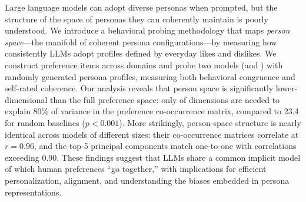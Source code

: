 Large language models can adopt diverse personas when prompted, but the structure of the space of personas they can coherently maintain is poorly understood.
We introduce a behavioral probing methodology that maps \emph{person space}---the manifold of coherent persona configurations---by measuring how consistently LLMs adopt profiles defined by everyday likes and dislikes.
We construct \nprefs{} preference items across \ndomains{} domains and probe two models (\nano and \mini) with \nprofiles{} randomly generated persona profiles, measuring both behavioral congruence and self-rated coherence.
Our analysis reveals that person space is significantly lower-dimensional than the full preference space: only \effrank{} of \nprefs{} dimensions are needed to explain 80\% of variance in the preference co-occurrence matrix, compared to 23.4 for random baselines ($p < 0.001$).
More strikingly, person-space structure is nearly identical across models of different sizes: their co-occurrence matrices correlate at $r = 0.96$, and the top-5 principal components match one-to-one with correlations exceeding $0.90$.
These findings suggest that LLMs share a common implicit model of which human preferences ``go together,'' with implications for efficient personalization, alignment, and understanding the biases embedded in persona representations.
